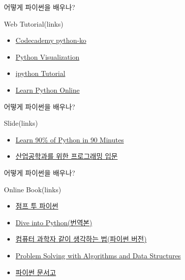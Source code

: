 \documentclass[10pt]{beamer}
\begin{document}
\begin{frame}{어떻게 파이썬을 배우나?}{}
\begin{block}{Web Tutorial(links)}
	\begin{itemize}
		\item \href{https://www.codecademy.com/en/tracks/python-ko}{Codecademy python-ko}
		\item \href{http://www.pythontutor.com/visualize.html}{Python Visualization}
		\item \href{https://wakari.io/nb/url///wakari.io/static/notebooks/Lecture_1_Introduction_to_Python_Programming.ipynb}{ipython Tutorial}
		\item \href{https://www.codementor.io/learn-python-online}{Learn Python Online}
	\end{itemize}
\end{block}
\end{frame}

\begin{frame}{어떻게 파이썬을 배우나?}{}
\begin{block}{Slide(links)}
	\begin{itemize}
		\item \href{http://www.slideshare.net/MattHarrison4/learn-90?qid=14fa96b9-9b49-483d-988d-a9016e4b1f07&v=qf1&b=&from_search=1}{Learn 90\% of Python in 90 Minutes}
		\item \href{http://www.slideshare.net/blissray/w-37771905?related=1}{산업공학과를 위한 프로그래밍 입문}
	\end{itemize}
\end{block}
\end{frame}

\begin{frame}{어떻게 파이썬을 배우나?}{}
\begin{block}{Online Book(links)}
	\begin{itemize}
		\item \href{https://wikidocs.net/book/1}{점프 투 파이썬}
		\item \href{http://coreapython.hosting.paran.com/dive/chap00.html}{Dive into Python(번역본)}
		\item \href{http://coreapython.hosting.paran.com/thinkCSpy(2nd)/index.htm}{컴퓨터 과학자 같이 생각하는 법(파이썬 버전)}
		\item \href{http://interactivepython.org/runestone/static/pythonds/index.html}{Problem Solving with Algorithms and Data Structures}
		\item \href{http://coreapython.hosting.paran.com/pygnudoc.html}{파이썬 문서고}
	\end{itemize}
\end{block}
\end{frame}
\end{document}
